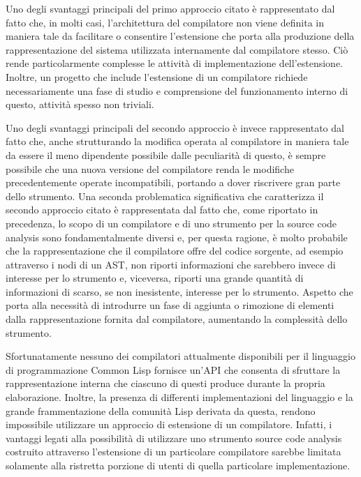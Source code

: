 Uno degli svantaggi principali del primo approccio citato è rappresentato dal
fatto che, in molti casi, l'architettura del compilatore non viene definita in
maniera tale da facilitare o consentire l'estensione che porta alla produzione
della rappresentazione del sistema utilizzata internamente dal compilatore
stesso. Ciò rende particolarmente complesse le attività di implementazione
dell'estensione. Inoltre, un progetto che include l'estensione di un compilatore
richiede necessariamente una fase di studio e comprensione del funzionamento
interno di questo, attività spesso non triviali.

Uno degli svantaggi principali del secondo approccio è invece rappresentato dal
fatto che, anche strutturando la modifica operata al compilatore in maniera tale
da essere il meno dipendente possibile dalle peculiarità di questo, è sempre
possibile che una nuova versione del compilatore renda le modifiche
precedentemente operate incompatibili, portando a dover riscrivere gran parte
dello strumento. Una seconda problematica significativa che caratterizza il
secondo approccio citato è rappresentata dal fatto che, come riportato in
precedenza, lo scopo di un compilatore e di uno strumento per la source code
analysis sono fondamentalmente diversi e, per questa ragione, è molto probabile
che la rappresentazione che il compilatore offre del codice sorgente, ad esempio
attraverso i nodi di un AST, non riporti informazioni che sarebbero invece di
interesse per lo strumento e, viceversa, riporti una grande quantità di
informazioni di scarso, se non inesistente, interesse per lo strumento. Aspetto
che porta alla necessità di introdurre un fase di aggiunta o rimozione di
elementi dalla rappresentazione fornita dal compilatore, aumentando la
complessità dello strumento.

Sfortunatamente nessuno dei compilatori attualmente disponibili per il
linguaggio di programmazione Common Lisp fornisce un'API che consenta di
sfruttare la rappresentazione interna che ciascuno di questi produce durante la
propria elaborazione. Inoltre, la presenza di differenti implementazioni del
linguaggio e la grande frammentazione della comunità Lisp derivata da questa,
rendono impossibile utilizzare un approccio di estensione di un compilatore.
Infatti, i vantaggi legati alla possibilità di utilizzare uno strumento source
code analysis costruito attraverso l'estensione di un particolare compilatore
sarebbe limitata solamente alla ristretta porzione di utenti di quella
particolare implementazione.

